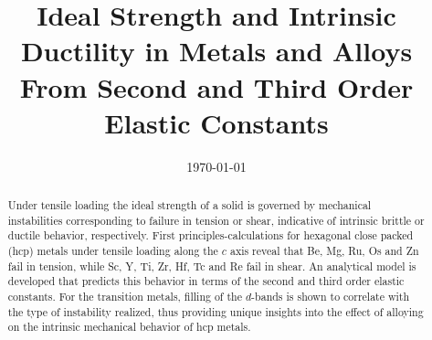 \documentclass[showpacs,aps,floatfix,prb,reprint,superscriptaddress]{revtex4-1}
\begin{document}
\title{\Large Ideal Strength and Intrinsic Ductility in Metals and Alloys From Second and Third Order Elastic Constants}


\date{\today}

\begin{abstract}
Under tensile loading the ideal strength of a solid is governed by mechanical instabilities corresponding to failure in tension or shear, indicative of intrinsic brittle or ductile behavior, respectively.  First principles-calculations for hexagonal close packed (hcp) metals under tensile loading along the $c$ axis reveal that Be, Mg, Ru, Os and Zn fail in tension, while Sc, Y, Ti, Zr, Hf, Tc and Re fail in shear. An analytical model is developed that predicts this behavior in terms of the second and third order elastic constants. For the transition metals, filling of the $d$-bands is shown to correlate with the type of instability realized, thus providing unique insights into the effect of alloying on the intrinsic mechanical behavior of hcp metals.
\end{abstract}

\maketitle
\end{document}
